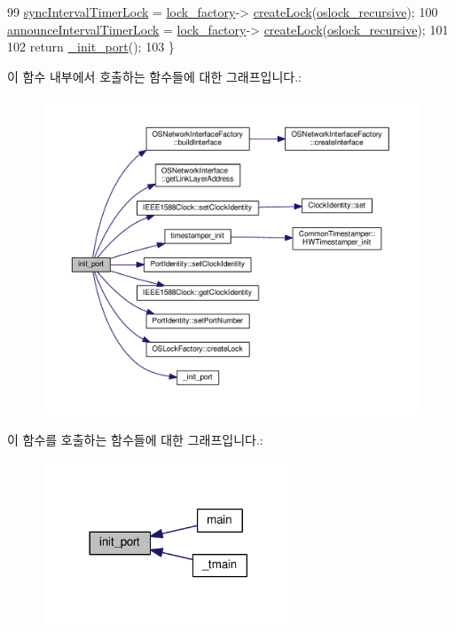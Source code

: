\begin{DoxyCode}
99     \hyperlink{class_common_port_a2457c760017e253f1202eb8cfef7c00b}{syncIntervalTimerLock} = \hyperlink{class_common_port_a79c67e28bcaacaa0f11c04682d085b36}{lock\_factory}->
      \hyperlink{class_o_s_lock_factory_ac0789ff714468962f0c1a317d7774585}{createLock}(\hyperlink{avbts__oslock_8hpp_a88e6fcd587e202a0bf3d0318d8fff8bbafd42ae3474dea6ba3413104730fb1063}{oslock\_recursive});
100     \hyperlink{class_common_port_a652fe375b2664ee0bedbc5c31a3556df}{announceIntervalTimerLock} = \hyperlink{class_common_port_a79c67e28bcaacaa0f11c04682d085b36}{lock\_factory}->
      \hyperlink{class_o_s_lock_factory_ac0789ff714468962f0c1a317d7774585}{createLock}(\hyperlink{avbts__oslock_8hpp_a88e6fcd587e202a0bf3d0318d8fff8bbafd42ae3474dea6ba3413104730fb1063}{oslock\_recursive});
101 
102     \textcolor{keywordflow}{return} \hyperlink{class_common_port_a5d364e6573c21517d6b9bd301a3f3543}{\_init\_port}();
103 \}
\end{DoxyCode}


이 함수 내부에서 호출하는 함수들에 대한 그래프입니다.\+:
\nopagebreak
\begin{figure}[H]
\begin{center}
\leavevmode
\includegraphics[width=350pt]{class_common_port_ae2f86408116b0a551da01c6f92f03ff9_cgraph}
\end{center}
\end{figure}




이 함수를 호출하는 함수들에 대한 그래프입니다.\+:
\nopagebreak
\begin{figure}[H]
\begin{center}
\leavevmode
\includegraphics[width=213pt]{class_common_port_ae2f86408116b0a551da01c6f92f03ff9_icgraph}
\end{center}
\end{figure}


